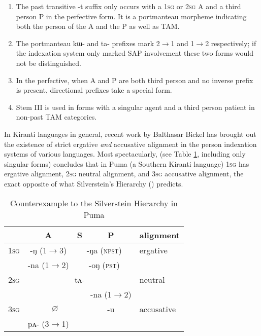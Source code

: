 \documentclass[oldfontcommands,oneside,a4paper,11pt]{article}
\newcommand{\ipa}[1]{{\phon \mbox{#1}}} %
\newcommand{\grise}[1]{\cellcolor{lightgray}\textbf{#1}}
\begin{document}
\begin{enumerate}
\item The past transitive \ipa{-t} suffix only occurs with a \textsc{1sg} or \textsc{2sg} A and a third person P in the perfective form. It is a portmanteau morpheme indicating both the person of the A and the P as well as TAM.
\item The portmanteau \ipa{kɯ-} and \ipa{ta-} prefixes mark 2$\rightarrow$1 and 1$\rightarrow$2 respectively; if the indexation system only marked SAP involvement these two forms would not be distinguished.
\item In the perfective, when A and P are both third person and no inverse prefix is present, directional prefixes take a special form.
\item Stem III is used in forms with a singular agent and a third person patient in non-past TAM categories.
\end{enumerate}

In Kiranti languages in general, recent work by Balthasar Bickel has brought out the existence of strict ergative \textit{and} accusative alignment in the person indexation systems of various languages. Most spectacularly, \citet{bickel08scope} (see Table \ref{tab:silverstein}, including only singular forms) concludes that in Puma (a Southern Kiranti language) \textsc{1sg} has ergative alignment, \textsc{2sg} neutral alignment, and \textsc{3sg} accusative alignment, the exact opposite of what Silverstein's Hierarchy (\citealt{silverstein76}) predicts.

\begin{table}[H]
\caption{Counterexample to the Silverstein Hierarchy in Puma} \label{tab:silverstein} \centering
\begin{tabular}{l|c|c|c|l}
\toprule
& A & S & P & alignment\\
\hline
\textsc{1sg}& \ipa{-ŋ} (1$\rightarrow$3)& \multicolumn{2}{|c|}{\ipa{-ŋa} \grise{}(\textsc{npst})}  &ergative\\
 & \ipa{-na} (1$\rightarrow$2)& \multicolumn{2}{|c|}{\ipa{-oŋ} \grise{}(\textsc{pst})} &\\
\hline
 \textsc{2sg} & \multicolumn{3}{c|}{\ipa{tʌ-}}& neutral\\
 \cline{4-4}
 &\multicolumn{2}{c|}{}&\ipa{-na} (1$\rightarrow$2)&\\
 \hline
  \textsc{3sg} & \multicolumn{2}{c|}{$\varnothing$} & \ipa{-u} &accusative\\
   \cline{2-2}
  &\ipa{pʌ-}  (3$\rightarrow$1) & &\\
  \bottomrule
\end{tabular}
\end{table}
\end{document}
